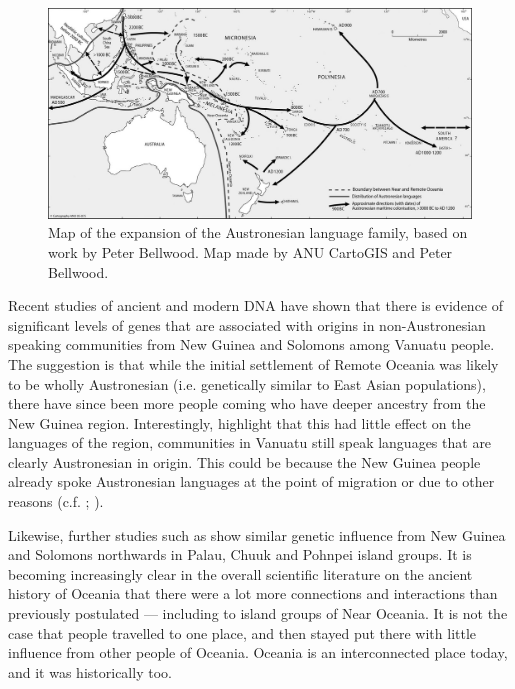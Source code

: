 \documentclass[unnumsec,webpdf,modern,medium]{oup-authoring-template}
\begin{document}
\begin{figure}[ht]
\centering
\includegraphics[width=\textwidth]{ANU_cartography.jpg}
\caption{Map of the expansion of the Austronesian language family, based on work by Peter Bellwood. Map made by ANU CartoGIS and Peter Bellwood.}
\label{austro_expansion_bellwood}
\end{figure}

Recent studies of ancient and modern DNA \citep{lipson_harvad_ancient_dna_vanuatu_2018, posth_jena_ancient_dna_vanuatu_2018} have shown that there is evidence of significant levels of genes that are associated with origins in non-Austronesian speaking communities from New Guinea and Solomons among Vanuatu people. The suggestion is that while the initial settlement of Remote Oceania was likely to be wholly Austronesian (i.e. genetically similar to East Asian populations), there have since been more people coming who have deeper ancestry from the New Guinea region. Interestingly, \citet{posth_jena_ancient_dna_vanuatu_2018} highlight that this had little effect on the languages of the region, communities in Vanuatu still speak languages that are clearly Austronesian in origin. This could be because the New Guinea people already spoke Austronesian languages at the point of migration or due to other reasons (c.f. \citet[288, 321]{barlow2023papuan}; \citet[209-210]{bedford2018ancient}).

Likewise, further studies such as \citet{liu2022ancient} show similar genetic influence from New Guinea and Solomons northwards in Palau, Chuuk and Pohnpei island groups. It is becoming increasingly clear in the overall scientific literature on the ancient history of Oceania that there were a lot more connections and interactions than previously postulated --- including to island groups of Near Oceania. It is not the case that people travelled to one place, and then stayed put there with little influence from other people of Oceania. Oceania is an interconnected place today, and it was historically too.
\end{document}
